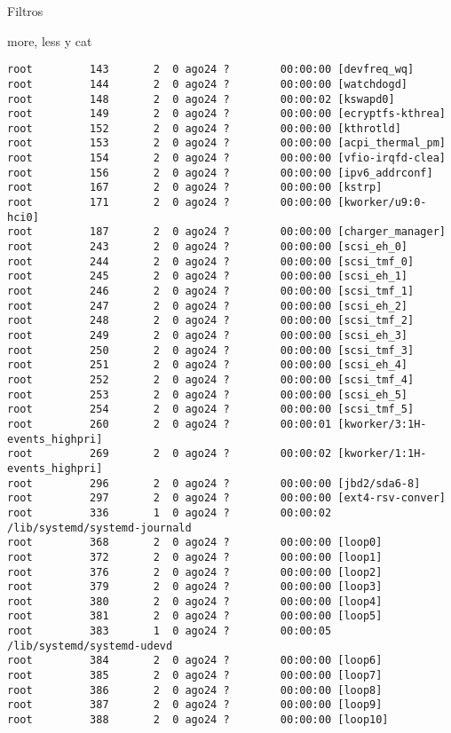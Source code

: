 \begin{section}{Filtros}
\begin{subsection}{more, less y cat}
\begin{lstlisting}[style=Ubuntu]
root         143       2  0 ago24 ?        00:00:00 [devfreq_wq]
root         144       2  0 ago24 ?        00:00:00 [watchdogd]
root         148       2  0 ago24 ?        00:00:02 [kswapd0]
root         149       2  0 ago24 ?        00:00:00 [ecryptfs-kthrea]
root         152       2  0 ago24 ?        00:00:00 [kthrotld]
root         153       2  0 ago24 ?        00:00:00 [acpi_thermal_pm]
root         154       2  0 ago24 ?        00:00:00 [vfio-irqfd-clea]
root         156       2  0 ago24 ?        00:00:00 [ipv6_addrconf]
root         167       2  0 ago24 ?        00:00:00 [kstrp]
root         171       2  0 ago24 ?        00:00:00 [kworker/u9:0-hci0]
root         187       2  0 ago24 ?        00:00:00 [charger_manager]
root         243       2  0 ago24 ?        00:00:00 [scsi_eh_0]
root         244       2  0 ago24 ?        00:00:00 [scsi_tmf_0]
root         245       2  0 ago24 ?        00:00:00 [scsi_eh_1]
root         246       2  0 ago24 ?        00:00:00 [scsi_tmf_1]
root         247       2  0 ago24 ?        00:00:00 [scsi_eh_2]
root         248       2  0 ago24 ?        00:00:00 [scsi_tmf_2]
root         249       2  0 ago24 ?        00:00:00 [scsi_eh_3]
root         250       2  0 ago24 ?        00:00:00 [scsi_tmf_3]
root         251       2  0 ago24 ?        00:00:00 [scsi_eh_4]
root         252       2  0 ago24 ?        00:00:00 [scsi_tmf_4]
root         253       2  0 ago24 ?        00:00:00 [scsi_eh_5]
root         254       2  0 ago24 ?        00:00:00 [scsi_tmf_5]
root         260       2  0 ago24 ?        00:00:01 [kworker/3:1H-events_highpri]
root         269       2  0 ago24 ?        00:00:02 [kworker/1:1H-events_highpri]
root         296       2  0 ago24 ?        00:00:00 [jbd2/sda6-8]
root         297       2  0 ago24 ?        00:00:00 [ext4-rsv-conver]
root         336       1  0 ago24 ?        00:00:02 /lib/systemd/systemd-journald
root         368       2  0 ago24 ?        00:00:00 [loop0]
root         372       2  0 ago24 ?        00:00:00 [loop1]
root         376       2  0 ago24 ?        00:00:00 [loop2]
root         379       2  0 ago24 ?        00:00:00 [loop3]
root         380       2  0 ago24 ?        00:00:00 [loop4]
root         381       2  0 ago24 ?        00:00:00 [loop5]
root         383       1  0 ago24 ?        00:00:05 /lib/systemd/systemd-udevd
root         384       2  0 ago24 ?        00:00:00 [loop6]
root         385       2  0 ago24 ?        00:00:00 [loop7]
root         386       2  0 ago24 ?        00:00:00 [loop8]
root         387       2  0 ago24 ?        00:00:00 [loop9]
root         388       2  0 ago24 ?        00:00:00 [loop10]

\end{lstlisting}
\end{subsection}
\end{section}
